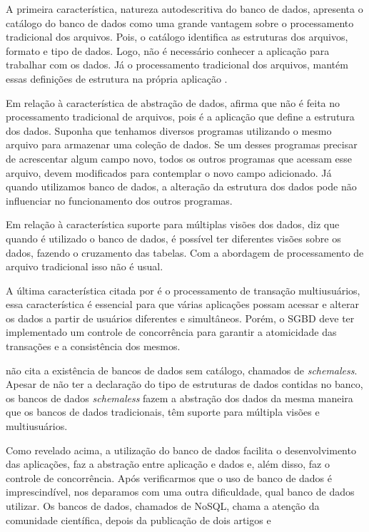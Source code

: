 A primeira característica, natureza autodescritiva do banco de dados, apresenta o catálogo do banco de dados como uma grande vantagem sobre o processamento tradicional dos arquivos. Pois, o catálogo identifica as estruturas dos arquivos, formato e tipo de dados. Logo, não é necessário conhecer a aplicação para trabalhar com os dados. Já  o processamento tradicional dos arquivos, mantém essas definições de estrutura na própria aplicação \cite{Elmasri}.


Em relação à característica de abstração de dados,  afirma que não é feita no processamento tradicional de arquivos, pois é a aplicação que define a estrutura dos dados. Suponha que tenhamos diversos programas utilizando o mesmo arquivo para armazenar uma coleção de dados. Se um desses programas precisar de acrescentar algum campo novo, todos os outros programas que acessam esse arquivo, devem modificados para contemplar o novo campo adicionado. Já quando utilizamos banco de dados, a alteração da estrutura dos dados pode não influenciar no funcionamento dos outros programas.

Em relação à característica suporte para múltiplas visões dos dados,  diz que quando é utilizado o banco de dados, é possível ter diferentes visões sobre os dados, fazendo o cruzamento das tabelas. Com a abordagem de processamento de arquivo tradicional isso não é usual.

A última característica citada por  é o processamento de transação multiusuários, essa característica é essencial para que várias aplicações possam acessar e alterar os dados a partir de usuários diferentes e simultâneos. Porém, o \ac{SGBD} deve ter implementado um controle de concorrência para garantir a atomicidade das transações e a consistência dos mesmos.

 não cita a existência de bancos de dados sem catálogo, chamados de \textit{schemaless}. Apesar de não ter a declaração do tipo de estruturas de dados contidas no banco, os bancos de dados \textit{schemaless} fazem a abstração dos dados da mesma maneira que os bancos de dados tradicionais, têm suporte para múltipla visões e multiusuários.

Como revelado acima, a utilização do banco de dados facilita o desenvolvimento das aplicações, faz a abstração entre aplicação e dados e, além disso, faz o controle de concorrência. Após verificarmos que o uso de banco de dados é imprescindível, nos deparamos com uma outra dificuldade, qual banco de dados utilizar. Os bancos de dados, chamados de NoSQL, chama a atenção da comunidade científica, depois da publicação de dois artigos  e 

